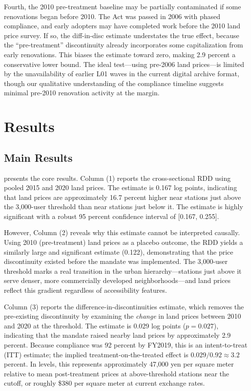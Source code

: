 \documentclass[12pt]{article}
\begin{document}
Fourth, the 2010 pre-treatment baseline may be partially contaminated if some renovations began before 2010. The Act was passed in 2006 with phased compliance, and early adopters may have completed work before the 2010 land price survey. If so, the diff-in-disc estimate understates the true effect, because the ``pre-treatment'' discontinuity already incorporates some capitalization from early renovations. This biases the estimate toward zero, making 2.9 percent a conservative lower bound. The ideal test---using pre-2006 land prices---is limited by the unavailability of earlier L01 waves in the current digital archive format, though our qualitative understanding of the compliance timeline suggests minimal pre-2010 renovation activity at the margin.


\section{Results}

\subsection{Main Results}

 presents the core results. Column (1) reports the cross-sectional RDD using pooled 2015 and 2020 land prices. The estimate is 0.167 log points, indicating that land prices are approximately 16.7 percent higher near stations just above the 3,000-user threshold than near stations just below it. The estimate is highly significant with a robust 95 percent confidence interval of [0.167, 0.255].

However, Column (2) reveals why this estimate cannot be interpreted causally. Using 2010 (pre-treatment) land prices as a placebo outcome, the RDD yields a similarly large and significant estimate (0.122), demonstrating that the price discontinuity existed before the mandate was implemented. The 3,000-user threshold marks a real transition in the urban hierarchy---stations just above it serve denser, more commercially developed neighborhoods---and land prices reflect this gradient regardless of accessibility features.

Column (3) reports the difference-in-discontinuities estimate, which removes the pre-existing discontinuity by examining the \textit{change} in land prices between 2010 and 2020 at the threshold. The estimate is 0.029 log points ($p = 0.027$), indicating that the mandate raised nearby land prices by approximately 2.9 percent. Because compliance was 92 percent by FY2019, this is an intent-to-treat (ITT) estimate; the implied treatment-on-the-treated effect is $0.029/0.92 \approx 3.2$ percent. In levels, this represents approximately 47,000 yen per square meter relative to mean post-treatment prices at above-threshold stations near the cutoff, or roughly \$380 per square meter at current exchange rates.
\end{document}
